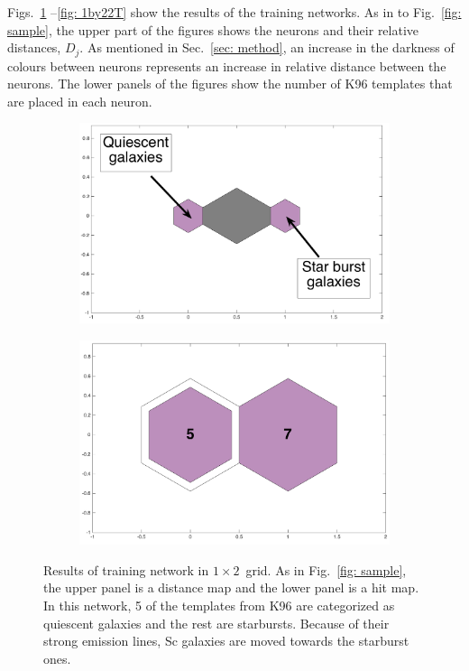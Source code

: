             Figs.~\ref{fig: 1by2T} --\ref{fig: 1by22T} show the results of the training networks.
            As in to Fig.~\ref{fig: sample}, the upper part of the figures shows the neurons and their relative distances, $D_j$.
            As mentioned in Sec.~\ref{sec: method}, an increase in the darkness of colours between neurons represents an increase in relative distance between the neurons.
            The lower panels of the figures show the number of K96 templates that are placed in each neuron. 
            \begin{figure}
                \begin{subfigure}[b]{0.5\textwidth}
                    \centering
                    \includegraphics[width=\textwidth]{images0.01/1d/dist_1_by_2.png}
                \end{subfigure}
                \hfill
                \begin{subfigure}[b]{0.5\textwidth}
                     \includegraphics[width=\textwidth]{images0.01/1d/hit_t_1_by_2.png}
                \end{subfigure}
                \caption{Results of training network in $1\times2$~grid. As in Fig.~\ref{fig: sample}, the upper panel is a distance map and the lower panel is a hit map. In this network, 5 of the templates from K96 are categorized as quiescent galaxies and the rest are starbursts. Because of their strong emission lines, Sc galaxies are moved towards the starburst ones.}
                 \label{fig: 1by2T}
            \end{figure}
        
